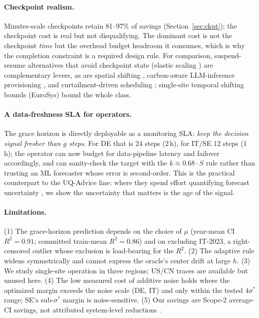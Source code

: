 \documentclass[sigconf,nonacm=false]{acmart}
\begin{document}
\paragraph{Checkpoint realism.}
Minutes-scale checkpoints retain 81--97\% of savings (Section~\ref{sec:ckpt});
the checkpoint cost is real but not disqualifying. The dominant cost is not the
checkpoint \emph{time} but the overhead budget headroom it consumes, which is
why the completion constraint is a required design rule. For comparison,
suspend-resume alternatives that avoid checkpoint state (elastic scaling
\cite{hanafy2023carbonscaler}) are complementary levers, as are spatial
shifting \cite{bian2024cafe,gsteiger2024caribou}, carbon-aware LLM-inference
provisioning \cite{ecoserve2025}, and curtailment-driven
scheduling \cite{wiesner2026curtailment,wiesner2024fedzero}; single-site
temporal shifting bounds (EuroSys) \cite{sukprasert2024limitations} bound the
whole class.

\paragraph{A data-freshness SLA for operators.}
The grace horizon is directly deployable as a monitoring SLA: \emph{keep the
decision signal fresher than $g$ steps}. For DE that is 24 steps (2\,h), for
IT/SE 12 steps (1\,h); the operator can now budget for data-pipeline latency
and failover accordingly, and can sanity-check the target with the
$k{\approx}0.68\cdot S$ rule rather than trusting an ML forecaster whose error
is second-order. This is the practical counterpart to the UQ-Advice line: where
they spend effort quantifying forecast uncertainty \cite{johnson2025uqadvice},
we show the uncertainty that matters is the age of the signal.

\paragraph{Limitations.}
(1) The grace-horizon prediction depends on the choice of $\mu$ (year-mean CI
$R^2{=}0.91$; committed train-mean $R^2{=}0.86$) and on excluding IT-2023, a
right-censored outlier whose exclusion is load-bearing for the $R^2$.
(2) The
adaptive rule widens symmetrically and cannot express the oracle's center
drift at large $h$. (3) We study single-site operation in three regions; US/CN
traces are available but unused here. (4) The low measured cost of additive
noise holds where the optimized margin exceeds the noise scale (DE, IT) and only
within the tested $4\sigma^*$ range; SE's sub-$\sigma^*$
margin is noise-sensitive. (5) Our savings are Scope-2 average-CI savings, not
attributed system-level reductions \cite{sukprasert2024avm,jiang2026equilibrium}.
\end{document}
